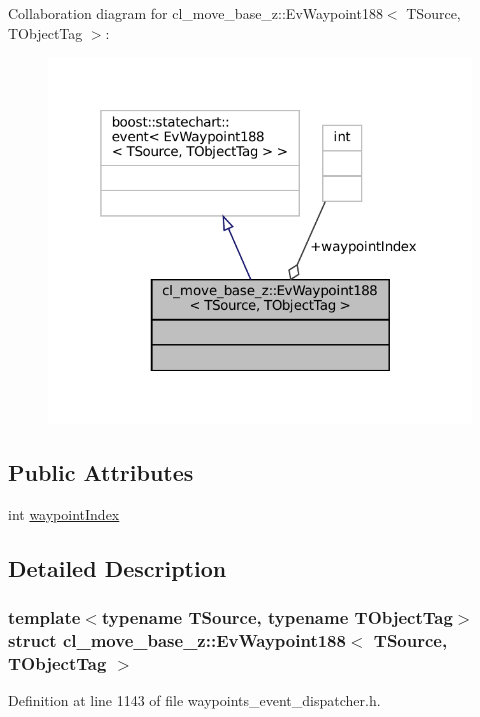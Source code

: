 Collaboration diagram for cl\+\_\+move\+\_\+base\+\_\+z\+:\+:Ev\+Waypoint188$<$ T\+Source, T\+Object\+Tag $>$\+:
\nopagebreak
\begin{figure}[H]
\begin{center}
\leavevmode
\includegraphics[width=319pt]{structcl__move__base__z_1_1EvWaypoint188__coll__graph}
\end{center}
\end{figure}
\subsection*{Public Attributes}
\begin{DoxyCompactItemize}
\item 
int \hyperlink{structcl__move__base__z_1_1EvWaypoint188_a3b47f8f6120cd1e6960978e8d18628fb}{waypoint\+Index}
\end{DoxyCompactItemize}


\subsection{Detailed Description}
\subsubsection*{template$<$typename T\+Source, typename T\+Object\+Tag$>$\newline
struct cl\+\_\+move\+\_\+base\+\_\+z\+::\+Ev\+Waypoint188$<$ T\+Source, T\+Object\+Tag $>$}



Definition at line 1143 of file waypoints\+\_\+event\+\_\+dispatcher.\+h.




